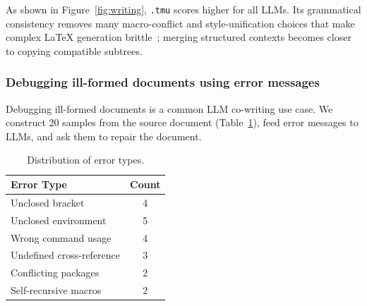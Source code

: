 As shown in Figure~\ref{fig:writing}, \texttt{.tmu} scores higher for all LLMs. Its grammatical consistency removes many macro-conflict and style-unification choices that make complex \LaTeX{} generation brittle~\cite{kale2025texpert}; merging structured contexts becomes closer to copying compatible subtrees.
%

\subsubsection{Debugging ill-formed documents using error messages}

Debugging ill-formed documents is a common LLM co-writing use case. We construct 20 samples from the source document (Table~\ref{tab:ill-dist}), feed error messages to LLMs, and ask them to repair the document.

\begin{table}[t]
    \centering
    \small
    \setlength{\tabcolsep}{4pt}
    \caption{Distribution of error types.}
    \label{tab:ill-dist}
    \begin{tabular}{lc}
        \toprule
        \textbf{Error Type} & \textbf{Count} \\
        \midrule
        Unclosed bracket & 4 \\
        Unclosed environment & 5 \\
        Wrong command usage & 4 \\
        Undefined cross-reference & 3 \\
        Conflicting packages & 2 \\
        Self-recursive macros & 2 \\
        \bottomrule
    \end{tabular}
\end{table}

